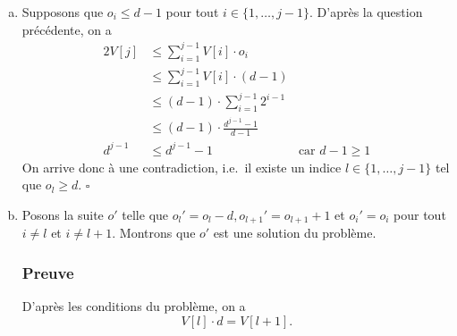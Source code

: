 \documentclass[12pt,a4paper]{article}
\begin{document}
\begin{enumerate}[a)]
 En utilisant le r\'esultat de la question pr\'ec\'edente, il en r\'esulte que
 \begin{equation*}
    V[j]\cdot g_j \leq \displaystyle\sum_{i=1}^{j} V[i]\cdot o_i. 
 \end{equation*}
 
 D'o\`u, 
 \begin{equation*}
    V[j]\cdot (g_j - o_j) \leq \displaystyle\sum_{i=1}^{j-1} V[i]\cdot o_i. 
 \end{equation*}
 Or $g_j - o_j \geq 1$ d'apr\`es la question a) et le fait que ce sont des entiers naturels.
 Donc, \( V[j] \leq \displaystyle\sum_{i=1}^{j-1} V[i]\cdot o_i\). \hfill\ensuremath{\square}
 
 Cette propri\'et\'e pr\'ecise l'une des mani\`eres d'utiliser le moins possible de bocaux pour remplir une quantit\'e de confiture donn\'ee. En effet, elle consiste \`a remplir au complet tous les bocaux des plus grandes capacit\'es possibles jusqu'\`a l'arriv\'ee \`a une certaine capacit\'e. Pour cette derni\`ere, on pr\'ef\`ere ne pas remplir tous les bocaux possibles, mais de se servir plut\^ot de ceux de capacit\'e plus petite. 
 
 \item Supposons que $o_i \leq d-1$ pour tout $i \in \{1,\dotsc,j-1\}$. D'apr\`es la question pr\'ec\'edente, on a 
 \begin{alignat*}{2}
 	V[j] &\leq \displaystyle\sum_{i=1}^{j-1} V[i]\cdot o_i \\
 		 &\leq \displaystyle\sum_{i=1}^{j-1} V[i]\cdot (d-1) \\
 		 &\leq (d-1)\cdot \displaystyle\sum_{i=1}^{j-1} 2^{i-1} \\
 		 &\leq (d-1)\cdot \frac{d^{j-1}-1}{d-1} \\
 	d^{j-1}	 &\leq d^{j-1}-1 & \text{car } d-1 \geq 1
 \end{alignat*}
 On arrive donc \`a une contradiction, i.e.\ il existe un indice \(l \in \{1,\dotsc,j-1\}\) tel que $o_l \geq d$. \hfill\ensuremath{\square}
 
 \item Posons la suite $o'$ telle que $o_{l}' = o_l-d, o_{l+1}' = o_{l+1}+1$ et $o_i' = o_i$ pour tout $i \neq l$ et $i \neq l+1$. Montrons que $o'$ est une solution du probl\`eme.
 
 \subsubsection*{Preuve}
 D'apr\`es les conditions du probl\`eme, on a
 \begin{equation*}
    V[l]\cdot d = V[l+1].
 \end{equation*}
 

\end{enumerate}
\end{document}
